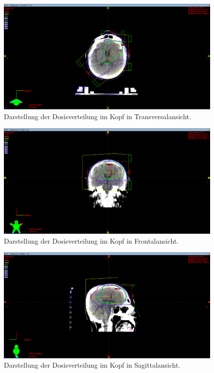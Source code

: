 \begin{figure}[H]
  \centering
  \includegraphics[width=\textwidth]{Bilder/Teilhirn2_Z.png}
  \caption{Darstellung der Dosisverteilung im Kopf in Transversalansicht.}
  \label{abb:Z2}
\end{figure}

\begin{figure}[H]
  \centering
  \includegraphics[width=\textwidth]{Bilder/Teilhirn2_Y.png}
  \caption{Darstellung der Dosisverteilung im Kopf in Frontalansicht.}
  \label{abb:Y2}
\end{figure}

\begin{figure}[H]
  \centering
  \includegraphics[width=\textwidth]{Bilder/Teilhirn2_X.png}
  \caption{Darstellung der Dosisverteilung im Kopf in Sagittalansicht.}
  \label{abb:X2}
\end{figure}

